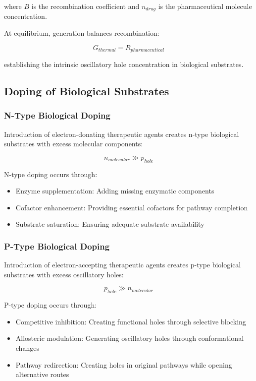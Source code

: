 \documentclass[12pt,a4paper]{article}
\begin{document}
where $B$ is the recombination coefficient and $n_{drug}$ is the pharmaceutical molecule concentration.

At equilibrium, generation balances recombination:

\begin{equation}
G_{thermal} = R_{pharmaceutical}
\end{equation}

establishing the intrinsic oscillatory hole concentration in biological substrates.

\subsection{Doping of Biological Substrates}

\subsubsection{N-Type Biological Doping}

Introduction of electron-donating therapeutic agents creates n-type biological substrates with excess molecular components:

\begin{equation}
n_{molecular} \gg p_{hole}
\end{equation}

N-type doping occurs through:
\begin{itemize}
\item Enzyme supplementation: Adding missing enzymatic components
\item Cofactor enhancement: Providing essential cofactors for pathway completion
\item Substrate saturation: Ensuring adequate substrate availability
\end{itemize}

\subsubsection{P-Type Biological Doping}

Introduction of electron-accepting therapeutic agents creates p-type biological substrates with excess oscillatory holes:

\begin{equation}
p_{hole} \gg n_{molecular}
\end{equation}

P-type doping occurs through:
\begin{itemize}
\item Competitive inhibition: Creating functional holes through selective blocking
\item Allosteric modulation: Generating oscillatory holes through conformational changes
\item Pathway redirection: Creating holes in original pathways while opening alternative routes
\end{itemize}
\end{document}

